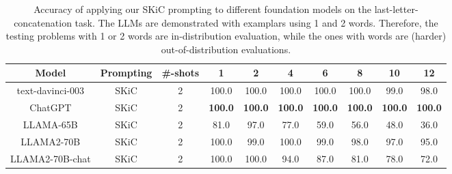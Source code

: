 \documentclass{article} \usepackage{arxiv}
\begin{document}
\begin{table}[ht]
 \caption{Accuracy of applying our SKiC prompting to different foundation models on the last-letter-concatenation task. The LLMs are demonstrated with examplars using 1 and 2 words. Therefore, the testing problems with 1 or 2 words are in-distribution evaluation, while the ones with  words are (harder) out-of-distribution evaluations. } \label{Tab:last_letter_results_llama2}
\centering
\small
\begin{tabular}{c|c|c|cc|ccccc} \toprule
\textbf{Model}                & \textbf{Prompting} &\textbf{\#-shots}     & \multicolumn{1}{c}{\textbf{1}} & \multicolumn{1}{c|}{\textbf{2}} & \multicolumn{1}{c}{\textbf{4}} & \multicolumn{1}{c}{\textbf{6}} & \multicolumn{1}{c}{\textbf{8}} & \multicolumn{1}{c}{\textbf{10}} & \multicolumn{1}{c}{\textbf{12}} \\ \midrule \midrule

text-davinci-003  
                           & SKiC  &2 & 100.0         & 100.0          & 100.0          & 100.0          & 100.0          & 99.0           & 98.0            \\  
ChatGPT   
                           & SKiC  &2 & \textbf{100.0}          & \textbf{100.0}          & \textbf{100.0}          & \textbf{100.0}          & \textbf{100.0}          & \textbf{100.0}           & \textbf{100.0}       \\ \midrule
LLAMA-65B
                           & SKiC  &2 & 81.0          & 97.0           & 77.0           & 59.0           & 56.0           & 48.0            & 36.0            \\ 
LLAMA2-70B & SKiC  &2 & 100.0         & 99.0          & 100.0          & 99.0          & 98.0          & 97.0           & 95.0            \\  
LLAMA2-70B-chat & SKiC  &2 & 100.0         & 100.0          & 94.0          & 87.0          & 81.0          & 78.0           & 72.0            \\   \bottomrule    
\end{tabular}
\end{table}
\end{document}
